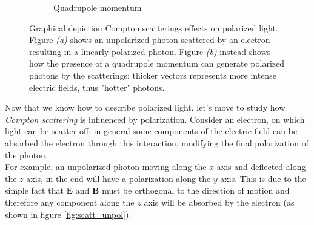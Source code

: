 \begin{figure}
\begin{subfigure}[b]{0.45\textwidth}
    \caption{Quadrupole momentum}
    \label{fig:scattering_quadrupole}
    \end{subfigure}
    \caption{Graphical depiction Compton scatterings effects on polarized light. Figure \emph{(a)} shows an unpolarized photon scattered by an electron resulting in a linearly polarized photon. Figure \emph{(b)} instead shows how the presence of a quadrupole momentum can generate polarized photons by the scatterings: thicker vectors represents more intense electric fields, thus "hotter" photons.}
    \label{fig:compton_polarization}
\end{figure}
Now that we know how to describe polarized light, let's move to study how \emph{Compton scattering} is influenced by polarization. Consider an electron, on which light can be scatter off: in general some components of the electric field can be absorbed the electron through this interaction, modifying the final polarization of the photon.\\
For example, an unpolarized photon moving along the $x$ axis and deflected along the $z$ axis, in the end will have a polarization along the $y$ axis. This is due to the simple fact that $\mathbf{E}$ and $\mathbf{B}$ must be orthogonal to the direction of motion and therefore any component along the $z$ axis will be absorbed by the electron (as shown in figure \ref{fig:scatt_unpol}).\\
